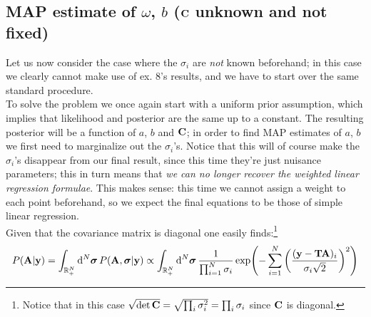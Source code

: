 \documentclass[a4paper]{article}
\newcommand{\R}{\mathbb{R}}
\newcommand{\mat}[1]{\vb{#1}}
\newcommand{\tonde}[1]{\left( {#1} \right)}
\begin{document}
\subsection{MAP estimate of $\omega$, $b$ ($\mat{C}$ unknown and not fixed)}
Let us now consider the case where the $\sigma_i$ are \emph{not} known beforehand; in this case we clearly cannot make use of ex. 8's results, and we have to start over the same standard procedure.\\
To solve the problem we once again start with a uniform prior assumption, which implies that likelihood and posterior are the same up to a constant. The resulting posterior will be a function of $a$, $b$ and $\mat{C}$; in order to find MAP estimates of $a$, $b$ we first need to marginalize out the $\sigma_i$'s. Notice that this will of course make the $\sigma_i$'s disappear from our final result, since this time they're just nuisance parameters; this in turn means that \emph{we can no longer recover the \emph{weighted} linear regression formulae}. This makes sense: this time we cannot assign a weight to each point beforehand, so we expect the final equations to be those of simple linear regression.\\
Given that the covariance matrix is diagonal one easily finds:\footnote{Notice that in this case $\sqrt{\det\mat{C}} = \sqrt{\prod_i \sigma_i^2} = \prod_i \sigma_i$ since $\mat{C}$ is diagonal.}
\begin{equation*}
    P(\vb{A}|\vb{y}) = \int_{\R_+^N} \dd[N]{\vb*{\sigma}} P(\vb{A}, \vb*{\sigma}|\vb{y}) \propto \int_{\R_+^N} \dd[N]{\vb*{\sigma}} \frac{1}{\prod_{i=1}^N \sigma_i}\exp(-\sum_{i=1}^N \tonde{\frac{(\vb{y}-\mat{T}\vb{A})_i}{\sigma_i \sqrt{2}}}^2)
\end{equation*}
\end{document}
